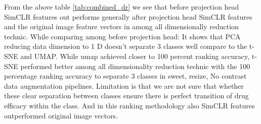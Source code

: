 From the above table \ref{tab:combined_dr} we see that before projection head SimCLR features out performs generally after projection head SimCLR features and the original image feature vectors in among all dimensionally reduction technic.
While comparing among before projection head: It shows that PCA reducing data dimension to 1 D doesn't separate 3 classes well compare to the t-SNE and UMAP. While umap achieved closer to 100 percent ranking accuracy, t-SNE performed better among all dimensionality reduction technic  with the 100 percentage ranking accuracy to separate 3 classes in sweet, resize, No contrast data augmentation pipelines. Limitation is that we are not sure that whether these clear separation between classes ensure there is perfect transition of drug efficacy within the class. And in this ranking methodology also SimCLR features outperformed original image vectors.